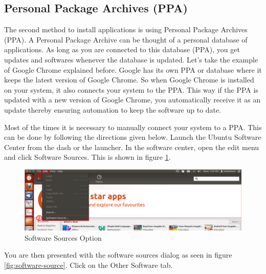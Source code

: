 \subsection*{Personal Package Archives (PPA)} 

The second method to install applications is using Personal Package Archives (PPA). A Personal Package Archive can be thought of a personal database of applications. As long as you are connected to this database (PPA), you get updates and softwares whenever the database is updated. Let's take the example of Google Chrome explained before. Google has its own PPA or database where it keeps the latest version of Google Chrome. So when Google Chrome is installed on your system, it also connects your system to the PPA. This way if the PPA is updated with a new version of Google Chrome, you automatically receive it as an update thereby ensuring automation to keep the software up to date. \\ 

\par \noindent Most of the times it is necessary to manually connect your system to a PPA. This can be done by following the directions given below. Launch the Ubuntu Software Center from the dash or the launcher. In the software center, open the edit menu and click Software Sources. This is shown in figure \ref{fig:software-sources-menu}.

\begin{figure}[h!]	
	\centering
	\includegraphics[width=350pt]{./images/applications/software-sources-menu.png}
	\caption{Software Sources Option}	
	\label{fig:software-sources-menu}		
\end{figure}

\par \noindent You are then presented with the software sources dialog as seen in figure \ref{fig:software-source}. Click on the Other Software tab.  \\

